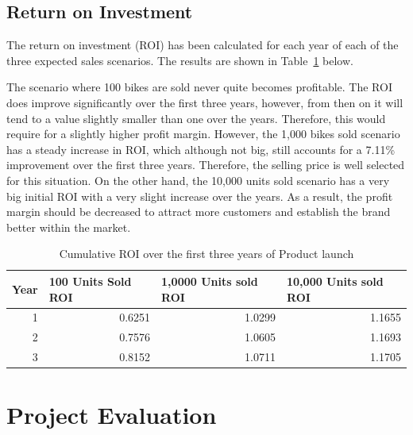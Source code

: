 \documentclass[a4paper,11pt]{article}
\begin{document}
\subsection{Return on Investment}

The return on investment (ROI) has been calculated for each year of each of the three expected sales scenarios. The results are shown in Table~\ref{tab:ROI} below. 

The scenario where 100 bikes are sold never quite becomes profitable. The ROI does improve significantly over the first three years, however, from then on it will tend to a value slightly smaller than one over the years. Therefore, this would require for a slightly higher profit margin. However, the 1,000 bikes sold scenario has a steady increase in ROI, which although not big, still accounts for a 7.11\% improvement over the first three years. Therefore, the selling price is well selected for this situation. On the other hand, the 10,000 units sold scenario has a very big initial ROI with a very slight increase over the years. As a result, the profit margin should be decreased to attract more customers and establish the brand better within the market. 

\begin{table}[!ht]
	\centering
	\caption{Cumulative ROI over the first three years of Product launch}
	\begin{tabular}{r r r r}
		\hline
		\multicolumn{1}{l}{Year}&\multicolumn{1}{l}{100 Units Sold ROI}&\multicolumn{1}{l}{1,0000 Units sold ROI}&\multicolumn{1}{l}{10,000 Units sold ROI}\\ \hline
		1&0.6251&1.0299&1.1655\\
		2&0.7576&1.0605&1.1693\\
		3&0.8152&1.0711&1.1705\\
	\end{tabular}
	\label{tab:ROI}
\end{table}

\section{Project Evaluation}



\end{document}
